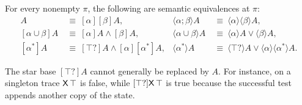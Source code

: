 For every nonempty $\pi$, the following are semantic equivalences at $\pi$:
\begin{align*}
 [\alpha;\beta]A&\ \equiv\ [\alpha][\beta]A,&
 \langle\alpha;\beta\rangle A&\ \equiv\ \langle\alpha\rangle\langle\beta\rangle A,\\
 [\alpha\cup\beta]A&\ \equiv\ [\alpha]A\land[\beta]A,&
 \langle\alpha\cup\beta\rangle A&\ \equiv\ \langle\alpha\rangle A\lor\langle\beta\rangle A,\\
 [\alpha^*]A&\ \equiv\ [\top?]A\land[\alpha][\alpha^*]A,&
 \langle\alpha^*\rangle A&\ \equiv\ \langle\top?\rangle A\lor
              \langle\alpha\rangle\langle\alpha^*\rangle A.
\end{align*}

The star base $[\top?]A$ cannot generally be replaced by $A$. For instance,
on a singleton trace $\mathsf{X}\,\top$ is false, while $[\top?]\mathsf{X}\,\top$ is true
because the successful test appends another copy of the state.
